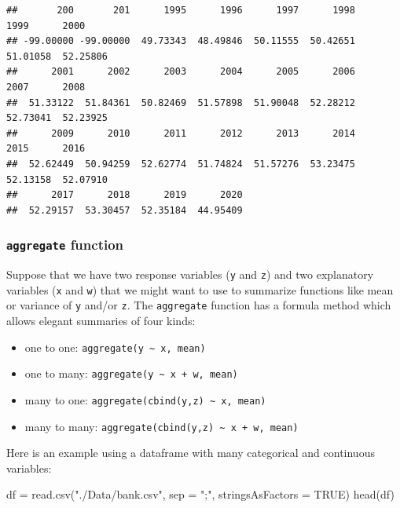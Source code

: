 \documentclass[
]{book}
\newenvironment{Shaded}{\begin{snugshade}}{\end{snugshade}}
\newcommand{\AttributeTok}[1]{\textcolor[rgb]{0.77,0.63,0.00}{#1}}
\newcommand{\ConstantTok}[1]{\textcolor[rgb]{0.00,0.00,0.00}{#1}}
\newcommand{\FunctionTok}[1]{\textcolor[rgb]{0.00,0.00,0.00}{#1}}
\newcommand{\NormalTok}[1]{#1}
\newcommand{\OtherTok}[1]{\textcolor[rgb]{0.56,0.35,0.01}{#1}}
\newcommand{\StringTok}[1]{\textcolor[rgb]{0.31,0.60,0.02}{#1}}
\providecommand{\tightlist}{%
  \setlength{\itemsep}{0pt}\setlength{\parskip}{0pt}}
\theoremstyle{definition}
\theoremstyle{definition}
\theoremstyle{definition}
\theoremstyle{definition}
\theoremstyle{remark}
\begin{document}
\begin{verbatim}
##       200       201      1995      1996      1997      1998      1999      2000 
## -99.00000 -99.00000  49.73343  48.49846  50.11555  50.42651  51.01058  52.25806 
##      2001      2002      2003      2004      2005      2006      2007      2008 
##  51.33122  51.84361  50.82469  51.57898  51.90048  52.28212  52.73041  52.23925 
##      2009      2010      2011      2012      2013      2014      2015      2016 
##  52.62449  50.94259  52.62774  51.74824  51.57276  53.23475  52.13158  52.07910 
##      2017      2018      2019      2020 
##  52.29157  53.30457  52.35184  44.95409
\end{verbatim}

\hypertarget{aggregate-function}{%
\subsubsection{\texorpdfstring{\texttt{aggregate} function}{aggregate function}}\label{aggregate-function}}

Suppose that we have two response variables (\texttt{y} and \texttt{z}) and two explanatory variables (\texttt{x} and \texttt{w}) that we might want to use to summarize functions like mean or variance of \texttt{y} and/or \texttt{z}. The \texttt{aggregate} function has a formula method which allows elegant summaries of four kinds:

\begin{itemize}
\tightlist
\item
  one to one: \texttt{aggregate(y\ \textasciitilde{}\ x,\ mean)}
\item
  one to many: \texttt{aggregate(y\ \textasciitilde{}\ x\ +\ w,\ mean)}
\item
  many to one: \texttt{aggregate(cbind(y,z)\ \textasciitilde{}\ x,\ mean)}
\item
  many to many: \texttt{aggregate(cbind(y,z)\ \textasciitilde{}\ x\ +\ w,\ mean)}
\end{itemize}

Here is an example using a dataframe with many categorical and continuous variables:

\begin{Shaded}
\begin{Highlighting}[]
\NormalTok{df }\OtherTok{=} \FunctionTok{read.csv}\NormalTok{(}\StringTok{"./Data/bank.csv"}\NormalTok{, }\AttributeTok{sep =} \StringTok{";"}\NormalTok{, }\AttributeTok{stringsAsFactors =} \ConstantTok{TRUE}\NormalTok{)}
\FunctionTok{head}\NormalTok{(df)}
\end{Highlighting}
\end{Shaded}
\end{document}
